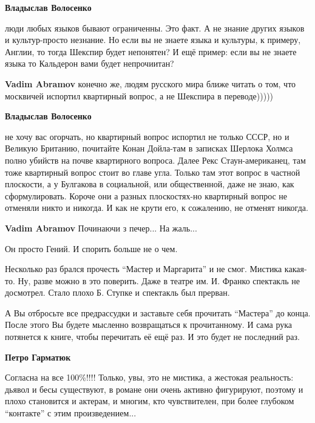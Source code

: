 \begin{itemize}
\begin{itemize}
\begin{itemize} %
\textbf{Владыслав Волосенко} 

люди любых языков бывают ограниченны. Это факт. А не знание других языков и
культур-просто незнание. Но если вы не знаете языка и культуры, к примеру,
Англии, то тогда Шекспир будет непонятен? И ещё пример: если вы не знаете языка то
Кальдерон вами будет непрочиитан?


\textbf{Vadim Abramov} конечно же, людям русского мира ближе читать о том, что москвичей испортил квартирный вопрос, а не Шекспира в переводе)))))

\textbf{Владыслав Волосенко} 

не хочу вас огорчать, но квартирный вопрос испортил не только СССР, но и Великую
Британию, почитайте Конан Дойла-там в записках Шерлока Холмса полно убийств на
почве квартирного вопроса. Далее Рекс Стаун-американец, там тоже квартирный
вопрос стоит во главе угла. Только там этот вопрос в частной плоскости, а у
Булгакова в социальной, или общественной, даже не знаю, как сформулировать. Короче
они а разных плоскостях-но квартирный вопрос не отменяли никто и никогда. И как
не крути его, к сожалению, не отменят никогда.


\textbf{Vadim Abramov} Починаючи з печер... На жаль...

\end{itemize} %

\end{itemize} %

Он просто Гений. И спорить больше не о чем.

Несколько раз брался прочесть \enquote{Мастер и Маргарита} и не смог.
Мистика какая-то.
Ну, разве можно в это поверить.
Даже в театре им. И. Франко спектакль не досмотрел. Стало плохо Б. Ступке и спектакль был прерван.

\begin{itemize} %

А Вы отбросьте все предрассудки и заставьте себя прочитать \enquote{Мастера} до конца.
После этого Вы будете мысленно возвращаться к прочитанному. И сама рука
потянется к книге, чтобы перечитать её ещё раз. И это будет не последний раз.


\textbf{Петро Гарматюк} 

Согласна на все 100\%!!!! Только, увы, это не мистика, а жестокая реальность: дьявол
и бесы существуют, в романе они очень активно фигурируют, поэтому и плохо
становится и актерам, и многим, кто чувствителен, при более глубоком \enquote{контакте}
с этим произведением...


\end{itemize}
\end{itemize}
